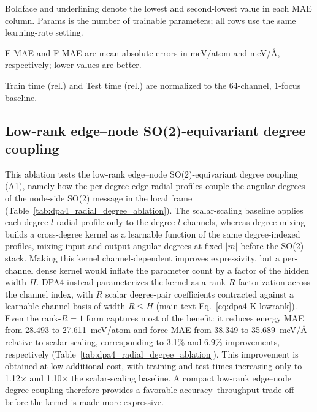 \begin{table}[ht]
\begin{threeparttable}
\begin{tabular*}{\linewidth}{@{\extracolsep{\fill}}cccccccc@{}}
            \bottomrule
        \end{tabular*}
        \begin{tablenotes}[flushleft]
            \PaperTableNotesStyle
            \item[] Boldface and underlining denote the lowest and second-lowest value in each MAE column. Params is the number of trainable parameters; all rows use the same learning-rate setting.
            \item[a] E MAE and F MAE are mean absolute errors in meV/atom and meV/\AA, respectively; lower values are better.
            \item[b] Train time (rel.) and Test time (rel.) are normalized to the 64-channel, 1-focus baseline.
        \end{tablenotes}
    \end{threeparttable}
\end{table}

\FloatBarrier
\subsection{Low-rank edge--node \texorpdfstring{SO(2)}{SO2}-equivariant degree coupling}
\label{sec:sm-radial-coupling}

This ablation tests the low-rank edge--node SO(2)-equivariant degree coupling (A1), namely how the per-degree edge radial profiles couple the angular degrees of the node-side SO(2) message in the local frame (Table~\ref{tab:dpa4_radial_degree_ablation}).
The scalar-scaling baseline applies each degree-$l$ radial profile only to the degree-$l$ channels, whereas degree mixing builds a cross-degree kernel as a learnable function of the same degree-indexed profiles, mixing input and output angular degrees at fixed $|m|$ before the SO(2) stack.
Making this kernel channel-dependent improves expressivity, but a per-channel dense kernel would inflate the parameter count by a factor of the hidden width $H$.
DPA4 instead parameterizes the kernel as a rank-$R$ factorization across the channel index, with $R$ scalar degree-pair coefficients contracted against a learnable channel basis of width $R\leq H$ (main-text Eq.~\ref{eq:dpa4-K-lowrank}).
Even the rank-$R=1$ form captures most of the benefit: it reduces energy MAE from 28.493 to 27.611~meV/atom and force MAE from 38.349 to 35.689~meV/\AA{} relative to scalar scaling, corresponding to 3.1\% and 6.9\% improvements, respectively (Table~\ref{tab:dpa4_radial_degree_ablation}).
This improvement is obtained at low additional cost, with training and test times increasing only to 1.12$\times$ and 1.10$\times$ the scalar-scaling baseline.
A compact low-rank edge--node degree coupling therefore provides a favorable accuracy--throughput trade-off before the kernel is made more expressive.

